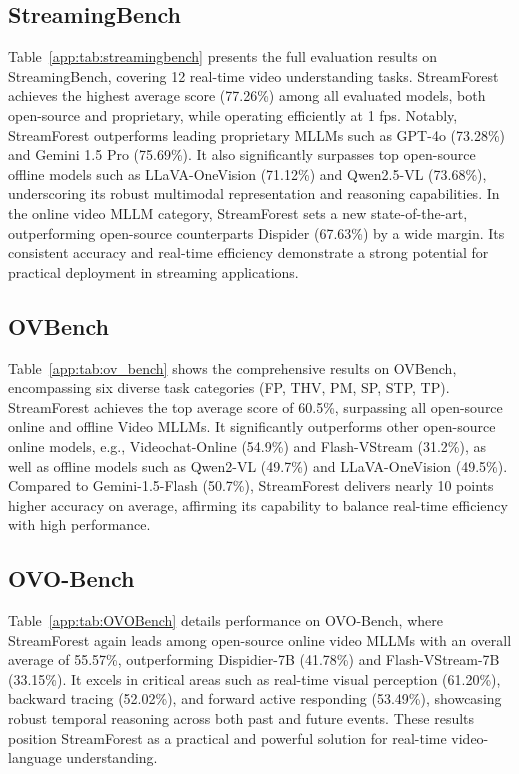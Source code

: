 \subsection{StreamingBench}
\label{app:sec:Full_Performances:StreamingBench}


Table~\ref{app:tab:streamingbench} presents the full evaluation results on StreamingBench, covering 12 real-time video understanding tasks. StreamForest achieves the highest average score (77.26\%) among all evaluated models, both open-source and proprietary, while operating efficiently at 1 fps. Notably, StreamForest outperforms leading proprietary MLLMs such as GPT-4o (73.28\%) and Gemini 1.5 Pro (75.69\%). It also significantly surpasses top open-source offline models such as LLaVA-OneVision (71.12\%) and Qwen2.5-VL (73.68\%), underscoring its robust multimodal representation and reasoning capabilities. In the online video MLLM category, StreamForest sets a new state-of-the-art, outperforming open-source counterparts Dispider (67.63\%) by a wide margin. Its consistent accuracy and real-time efficiency demonstrate a strong potential for practical deployment in streaming applications.

\subsection{OVBench}
\label{app:sec:Full_Performances:OVBench}


Table~\ref{app:tab:ov_bench} shows the comprehensive results on OVBench, encompassing six diverse task categories (FP, THV, PM, SP, STP, TP). StreamForest achieves the top average score of 60.5\%, surpassing all open-source online and offline Video MLLMs. It significantly outperforms other open-source online models, e.g., Videochat-Online (54.9\%) and Flash-VStream (31.2\%), as well as offline models such as Qwen2-VL (49.7\%) and LLaVA-OneVision (49.5\%). Compared to Gemini-1.5-Flash (50.7\%), StreamForest delivers nearly 10 points higher accuracy on average, affirming its capability to balance real-time efficiency with high performance.

\subsection{OVO-Bench}
\label{app:sec:Full_Performances:OVO-Bench}


Table~\ref{app:tab:OVOBench} details performance on OVO-Bench, where StreamForest again leads among open-source online video MLLMs with an overall average of 55.57\%, outperforming Dispidier-7B (41.78\%) and Flash-VStream-7B (33.15\%). It excels in critical areas such as real-time visual perception (61.20\%), backward tracing (52.02\%), and forward active responding (53.49\%), showcasing robust temporal reasoning across both past and future events. These results position StreamForest as a practical and powerful solution for real-time video-language understanding.







